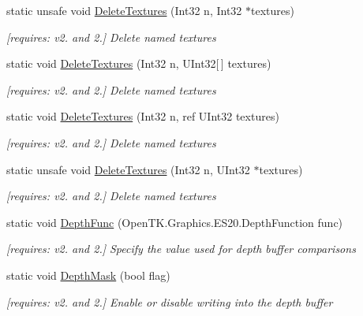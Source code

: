 \begin{DoxyCompactItemize}
static unsafe void \hyperlink{class_open_t_k_1_1_graphics_1_1_e_s20_1_1_g_l_a30b4f5cacc5ce2522fff7616c9dac5a3}{Delete\-Textures} (Int32 n, Int32 $\ast$textures)
\begin{DoxyCompactList}\small\item\em \mbox{[}requires\-: v2. and 2.\mbox{]} Delete named textures \end{DoxyCompactList}\item 
static void \hyperlink{class_open_t_k_1_1_graphics_1_1_e_s20_1_1_g_l_a7adb3349b340499d972cee903ca064db}{Delete\-Textures} (Int32 n, U\-Int32\mbox{[}$\,$\mbox{]} textures)
\begin{DoxyCompactList}\small\item\em \mbox{[}requires\-: v2. and 2.\mbox{]} Delete named textures \end{DoxyCompactList}\item 
static void \hyperlink{class_open_t_k_1_1_graphics_1_1_e_s20_1_1_g_l_a9b0ae4bc992d007984a08a013da057a1}{Delete\-Textures} (Int32 n, ref U\-Int32 textures)
\begin{DoxyCompactList}\small\item\em \mbox{[}requires\-: v2. and 2.\mbox{]} Delete named textures \end{DoxyCompactList}\item 
static unsafe void \hyperlink{class_open_t_k_1_1_graphics_1_1_e_s20_1_1_g_l_a6bd7df54b5c813f880c5c1637e95d770}{Delete\-Textures} (Int32 n, U\-Int32 $\ast$textures)
\begin{DoxyCompactList}\small\item\em \mbox{[}requires\-: v2. and 2.\mbox{]} Delete named textures \end{DoxyCompactList}\item 
static void \hyperlink{class_open_t_k_1_1_graphics_1_1_e_s20_1_1_g_l_a3b45a55b101a56fcaf0b5158b0a2795c}{Depth\-Func} (Open\-T\-K.\-Graphics.\-E\-S20.\-Depth\-Function func)
\begin{DoxyCompactList}\small\item\em \mbox{[}requires\-: v2. and 2.\mbox{]} Specify the value used for depth buffer comparisons \end{DoxyCompactList}\item 
static void \hyperlink{class_open_t_k_1_1_graphics_1_1_e_s20_1_1_g_l_a15fdca744ae440505aa3ea08e7def7a0}{Depth\-Mask} (bool flag)
\begin{DoxyCompactList}\small\item\em \mbox{[}requires\-: v2. and 2.\mbox{]} Enable or disable writing into the depth buffer \end{DoxyCompactList}\item 

\end{DoxyCompactItemize}
